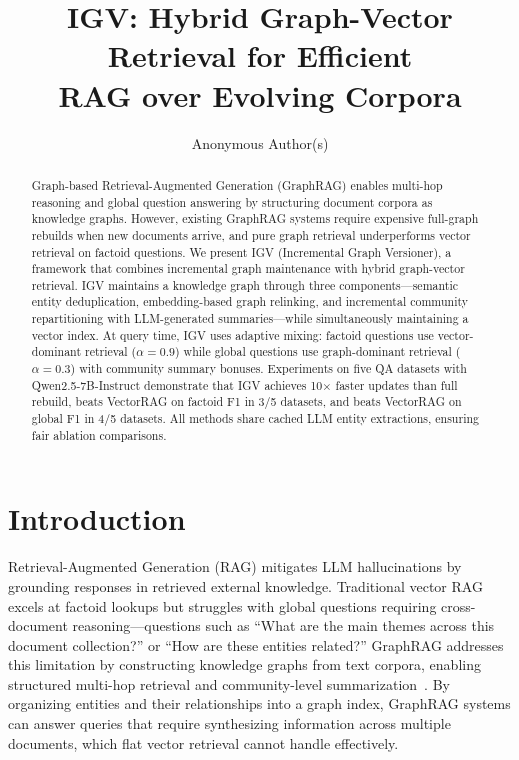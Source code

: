 \documentclass[sigconf,anonymous,review]{acmart}
\begin{document}
\title{IGV: Hybrid Graph-Vector Retrieval for Efficient\\RAG over Evolving Corpora}

\author{Anonymous Author(s)}

\begin{abstract}
Graph-based Retrieval-Augmented Generation (GraphRAG) enables multi-hop reasoning and global question answering by structuring document corpora as knowledge graphs. However, existing GraphRAG systems require expensive full-graph rebuilds when new documents arrive, and pure graph retrieval underperforms vector retrieval on factoid questions. We present IGV (Incremental Graph Versioner), a framework that combines incremental graph maintenance with hybrid graph-vector retrieval. IGV maintains a knowledge graph through three components---semantic entity deduplication, embedding-based graph relinking, and incremental community repartitioning with LLM-generated summaries---while simultaneously maintaining a vector index. At query time, IGV uses adaptive mixing: factoid questions use vector-dominant retrieval ($\alpha{=}0.9$) while global questions use graph-dominant retrieval ($\alpha{=}0.3$) with community summary bonuses. Experiments on five QA datasets with Qwen2.5-7B-Instruct demonstrate that IGV achieves 10$\times$ faster updates than full rebuild, beats VectorRAG on factoid F1 in 3/5 datasets, and beats VectorRAG on global F1 in 4/5 datasets. All methods share cached LLM entity extractions, ensuring fair ablation comparisons.
\end{abstract}


\maketitle

\section{Introduction}

Retrieval-Augmented Generation (RAG) mitigates LLM hallucinations by grounding responses in retrieved external knowledge. Traditional vector RAG excels at factoid lookups but struggles with global questions requiring cross-document reasoning---questions such as ``What are the main themes across this document collection?'' or ``How are these entities related?'' GraphRAG addresses this limitation by constructing knowledge graphs from text corpora, enabling structured multi-hop retrieval and community-level summarization~\cite{edge2024graphrag,guo2025lightrag}. By organizing entities and their relationships into a graph index, GraphRAG systems can answer queries that require synthesizing information across multiple documents, which flat vector retrieval cannot handle effectively.
\end{document}
